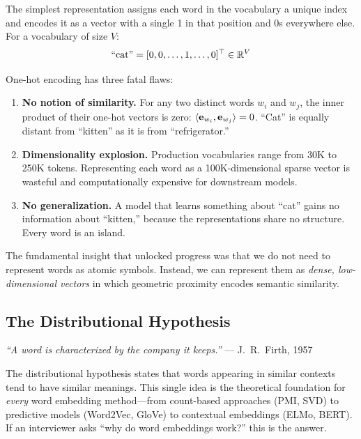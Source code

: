 The simplest representation assigns each word in the vocabulary a unique index
and encodes it as a vector with a single 1 in that position and 0s everywhere
else.  For a vocabulary of size $V$:
\[
    \text{``cat''} = [0, 0, \ldots, 1, \ldots, 0]^\top \in \mathbb{R}^V
\]

One-hot encoding has three fatal flaws:

\begin{enumerate}[label=\textbf{\arabic*.}]
    \item \textbf{No notion of similarity.}  For any two distinct words $w_i$
    and $w_j$, the inner product of their one-hot vectors is zero:
    $\langle\mathbf{e}_{w_i},\mathbf{e}_{w_j}\rangle = 0$.  ``Cat'' is equally distant from
    ``kitten'' as it is from ``refrigerator.''

    \item \textbf{Dimensionality explosion.}  Production vocabularies range from
    30K to 250K tokens.  Representing each word as a 100K-dimensional sparse
    vector is wasteful and computationally expensive for downstream models.

    \item \textbf{No generalization.}  A model that learns something about
    ``cat'' gains no information about ``kitten,'' because the representations
    share no structure.  Every word is an island.
\end{enumerate}

The fundamental insight that unlocked progress was that we do not need to
represent words as atomic symbols.  Instead, we can represent them as
\emph{dense, low-dimensional vectors} in which geometric proximity encodes
semantic similarity.

\subsection{The Distributional Hypothesis}

\begin{keyinsight}
\emph{``A word is characterized by the company it keeps.''}
--- J.~R.~Firth, 1957

The distributional hypothesis states that words appearing in similar contexts
tend to have similar meanings.  This single idea is the theoretical foundation
for \emph{every} word embedding method---from count-based approaches (PMI, SVD)
to predictive models (Word2Vec, GloVe) to contextual embeddings (ELMo, BERT).
If an interviewer asks ``why do word embeddings work?'' this is the answer.
\end{keyinsight}

